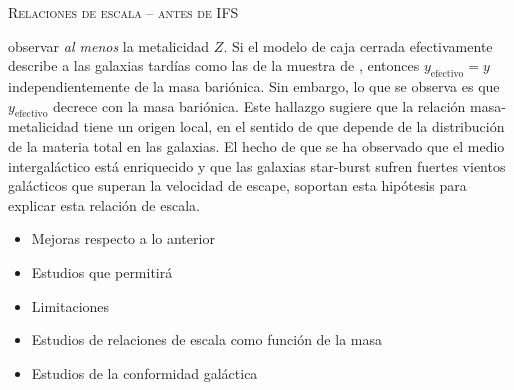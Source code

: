 \documentclass[xcolor=dvipsnames,4pt]{beamer}
\begin{document}
\begin{frame}[allowframebreaks]{\textsc{Relaciones de escala -- antes de IFS}}
\begin{description}
observar \emph{al menos} la metalicidad $Z$. Si el modelo de caja cerrada efectivamente describe a
las galaxias tardías como las de la muestra de \citeauthor{Tremonti2004}, entonces
$y_\text{efectivo}=y$ independientemente de la masa bariónica. Sin embargo, lo que se observa es que
$y_\text{efectivo}$ decrece con la masa bariónica. Este hallazgo sugiere que la relación
masa-metalicidad tiene un origen local, en el sentido de que depende de la distribución de la
materia total en las galaxias. El hecho de que se ha observado que el medio intergaláctico está
enriquecido y que las galaxias star-burst sufren fuertes vientos galácticos que superan la velocidad
de escape, soportan esta hipótesis para explicar esta relación de escala.
%
\end{description}

%
\end{frame}

\begin{frame}{}
%
\begin{itemize}
\item Mejoras respecto a lo anterior
\item Estudios que permitirá
\item Limitaciones
\end{itemize}
%
\end{frame}


\begin{frame}{}
%
\begin{itemize}
\item Estudios de relaciones de escala como función de la masa
\item Estudios de la conformidad galáctica
\end{itemize}
%
\end{frame}
\end{document}

